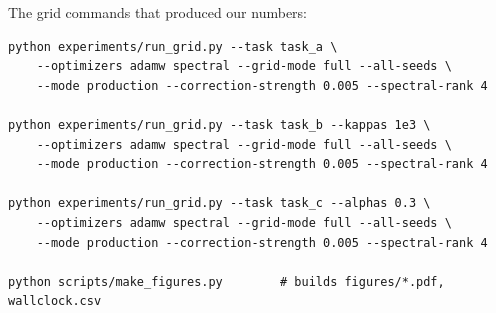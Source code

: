 \documentclass{article}
\begin{document}
The grid commands that produced our numbers:
{\small
\begin{verbatim}
python experiments/run_grid.py --task task_a \
    --optimizers adamw spectral --grid-mode full --all-seeds \
    --mode production --correction-strength 0.005 --spectral-rank 4

python experiments/run_grid.py --task task_b --kappas 1e3 \
    --optimizers adamw spectral --grid-mode full --all-seeds \
    --mode production --correction-strength 0.005 --spectral-rank 4

python experiments/run_grid.py --task task_c --alphas 0.3 \
    --optimizers adamw spectral --grid-mode full --all-seeds \
    --mode production --correction-strength 0.005 --spectral-rank 4

python scripts/make_figures.py        # builds figures/*.pdf, wallclock.csv
\end{verbatim}}
\end{document}
